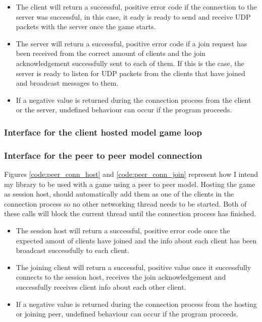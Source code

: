 

\begin{itemize}
\item The client will return a successful, positive error code if the connection to the server was successful, in this case, it eady is ready to send and receive UDP packets with the server once the game starts.
\item The server will return a successful, positive error code if a join request has been received from the correct amount of clients and the join acknowledgement successfully sent to each of them. If this is the case, the server is ready to listen for UDP packets from the clients that have joined and broadcast messages to them.
\item If a negative value is returned during the connection process from the client or the server, undefined behaviour can occur if the program proceeds.
\end{itemize}

\newpage
\subsubsection{Interface for the client hosted model game loop}



\newpage
\subsubsection{Interface for the peer to peer model connection}
Figures \ref{code:peer_conn_host} and \ref{code:peer_conn_join} represent how I intend my library to be used with a game using a peer to peer model. Hosting the game as session host, should automatically add them as one of the clients in the connection process so no other networking thread needs to be started. Both of these calls will block the current thread until the connection process has finished.



\begin{itemize}
\item The session host will return a successful, positive error code once the expected amout of clients have joined and the info about each client has been broadcast successfully to each client.
\item The joining client will return a successful, positive value once it successfully connects to the session host, receives the join acknowledgement and successfully receives client info about each other client.
\item If a negative value is returned during the connection process from the hosting or joining peer, undefined behaviour can occur if the program proceeds.
\end{itemize}


